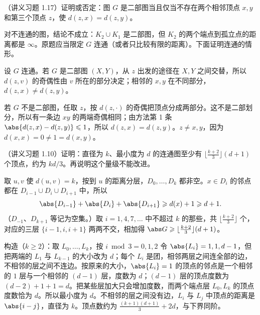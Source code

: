 \begin{workedexample}\label{we:distance-layers:equal-distance}
（讲义习题 1.17）证明或否定：图 $G$ 是二部图当且仅当不存在两个相邻顶点 $x,y$ 和第三个顶点 $z$，使 $d(z,x)=d(z,y)$。
\end{workedexample}
\begin{remark}[讲义原题有误]
对不连通的图，结论不成立：$K_2\cup K_1$ 是二部图，但 $K_2$ 的两个端点到孤立点的距离都是 $\infty$。原题应当限定 $G$ 连通（或者只比较有限的距离）。下面证明连通的情形。
\end{remark}
\begin{solution}
设 $G$ 连通。若 $G$ 是二部图 $(X,Y)$，从 $z$ 出发的途径在 $X,Y$ 之间交替，所以 $d(z,v)$ 的奇偶性由 $v$ 所在的部分决定；相邻的 $x,y$ 在不同部分，$d(z,x)\neq d(z,y)$。

若 $G$ 不是二部图，任取 $z$，按 $d(z,\cdot)$ 的奇偶把顶点分成两部分。这不是二部划分，所以有一条边 $xy$ 的两端奇偶相同；由方法第 1 条 $\abs{d(z,x)-d(z,y)}\leqslant1$，所以 $d(z,x)=d(z,y)$。$z\neq x,y$，因为 $d(x,x)=0\neq1=d(x,y)$。
\end{solution}

\begin{workedexample}\label{we:distance-layers:diameter}
（讲义习题 1.10）证明：直径为 $k$、最小度为 $d$ 的连通图至少有 $\lfloor\frac{k+2}3\rfloor(d+1)$ 个顶点，约为 $kd/3$。再说明这个量级不能改进。
\end{workedexample}
\begin{solution}
取 $u,v$ 使 $d(u,v)=k$，按到 $u$ 的距离分层，$D_0,\dots,D_k$ 都非空。$x\in D_i$ 的邻点都在 $D_{i-1}\cup D_i\cup D_{i+1}$ 中，所以
\[
\abs{D_{i-1}}+\abs{D_i}+\abs{D_{i+1}}\geqslant d(x)+1\geqslant d+1 .
\]
（$D_{-1}$、$D_{k+1}$ 等记为空集。）取 $i=1,4,7,\dots$ 中不超过 $k$ 的那些，共 $\lfloor\frac{k+2}3\rfloor$ 个，对应的三层 $\{i-1,i,i+1\}$ 两两不交，相加得 $\abs G\geqslant\lfloor\frac{k+2}3\rfloor(d+1)$。

构造（$k\geqslant2$）：取 $L_0,\dots,L_k$，按 $i\bmod3=0,1,2$ 令 $\abs{L_i}=1,1,d-1$，但把两端的 $L_1$ 与 $L_{k-1}$ 的大小改为 $d$；每个 $L_i$ 是团，相邻两层之间连全部的边，不相邻的层之间不连边。按原来的大小，$\abs{L_i}=1$ 的顶点的邻点是一个相邻的 $1$ 层与一个相邻的 $(d-1)$ 层，度数为 $d$；$(d-1)$ 层的顶点度数为 $(d-2)+1+1=d$。把某些层加大只会增加度数，而两个端点层 $L_0,L_k$ 的顶点度数恰为 $d$。所以最小度为 $d$。不相邻的层之间没有边，$L_i$ 与 $L_j$ 中顶点的距离是 $\abs{i-j}$，直径为 $k$。顶点数约为 $\frac{(k+1)(d+1)}3+2d$，与下界同阶。
\end{solution}

